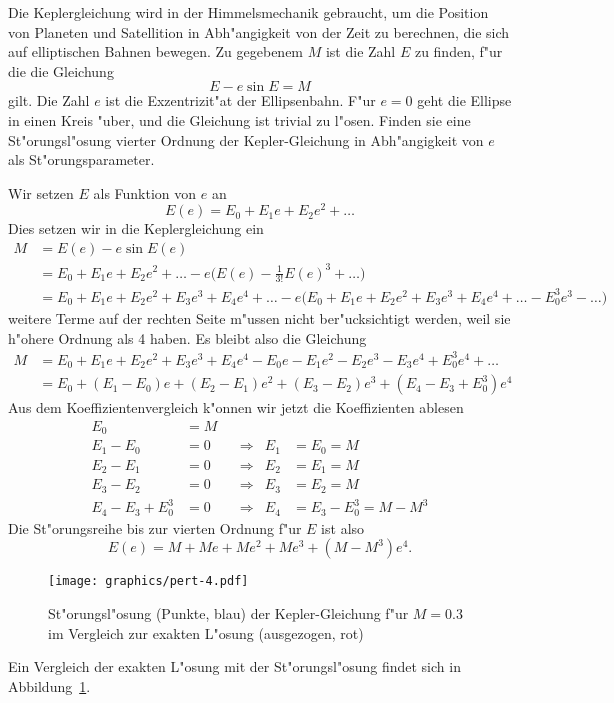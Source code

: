 Die Keplergleichung wird in der Himmelsmechanik gebraucht, um die 
Position von Planeten und Satellition in Abh"angigkeit von der Zeit
zu berechnen, die sich auf elliptischen Bahnen bewegen.
Zu gegebenem $M$ ist die Zahl $E$ zu finden, f"ur die die Gleichung
\[
E-e\sin E=M
\]
gilt.
Die Zahl $e$ ist die Exzentrizit"at der Ellipsenbahn. F"ur $e=0$
geht die Ellipse in einen Kreis "uber, und die Gleichung ist trivial
zu l"osen. Finden sie eine St"orungsl"osung vierter Ordnung
der Kepler-Gleichung in Abh"angigkeit von $e$ als St"orungsparameter.

\begin{loesung}
Wir setzen $E$ als Funktion von $e$ an
\[
E(e)
=
E_0+E_1e+E_2e^2+\dots
\]
Dies setzen wir in die Keplergleichung ein
\begin{align*}
M
&=
E(e)-e\sin E(e)
\\
&=
E_0+E_1e+E_2e^2+\dots
-e\biggl(
E(e)-\frac1{3!}E(e)^3+\dots
\biggr)
\\
&=
E_0+E_1e+E_2e^2+E_3e^3+E_4e^4+\dots
-e\biggl(
E_0+E_1e+E_2e^2+E_3e^3+E_4e^4+\dots
-E_0^3e^3-\dots
\biggr)
\end{align*}
weitere Terme auf der rechten Seite m"ussen nicht ber"ucksichtigt
werden, weil sie h"ohere Ordnung als 4 haben.
Es bleibt also die Gleichung
\begin{align*}
M
&=
E_0+E_1e+E_2e^2+E_3e^3+E_4e^4
-E_0e-E_1e^2-E_2e^3-E_3e^4
+E_0^3e^4+\dots
\\
&=
E_0
+(E_1-E_0)e
+(E_2-E_1)e^2
+(E_3-E_2)e^3
+(E_4-E_3+E_0^3)e^4
\end{align*}
Aus dem Koeffizientenvergleich k"onnen wir jetzt die Koeffizienten ablesen
\begin{equation}
\begin{aligned}
E_0&=M
\\
E_1-E_0&=0&&\Rightarrow&E_1&=E_0=M\\
E_2-E_1&=0&&\Rightarrow&E_2&=E_1=M\\
E_3-E_2&=0&&\Rightarrow&E_3&=E_2=M\\
E_4-E_3+E_0^3&=0&&\Rightarrow&E_4&=E_3-E_0^3=M-M^3
\end{aligned}
\end{equation}
Die St"orungsreihe bis zur vierten Ordnung f"ur $E$ ist also
\[
E(e)=M+Me+Me^2+Me^3+(M-M^3)e^4.
\]
\begin{figure}
\centering
\texttt{[image: graphics/pert-4.pdf]}
\caption{St"orungsl"osung (Punkte, blau) der Kepler-Gleichung f"ur $M=0.3$
im Vergleich zur exakten L"osung (ausgezogen, rot)
\label{10001:kepler}}
\end{figure}
Ein Vergleich der exakten L"osung mit der St"orungsl"osung findet sich
in Abbildung~\ref{10001:kepler}.
\end{loesung}

